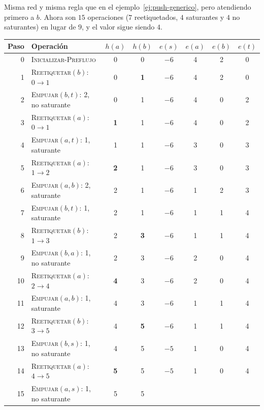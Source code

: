 \documentclass[11pt,letterpaper]{article}
\begin{document}
\begin{ejemplo}
  \label{ej:push-ping-pong}
  Misma red y misma regla que en el ejemplo~\ref{ej:push-generico},
  pero atendiendo primero a $b$. Ahora son $15$ operaciones
  ($7$ reetiquetados, $4$ saturantes y $4$ no saturantes) en lugar de
  $9$, y el valor sigue siendo $4$.
  \begin{center}
  \small
  \begin{tabular}{rlcccccc}
    \toprule
    \textbf{Paso} & \textbf{Operación} & $h(a)$ & $h(b)$
      & $e(s)$ & $e(a)$ & $e(b)$ & $e(t)$ \\
    \midrule
    0 & \textsc{Inicializar-Preflujo} & 0 & 0 & $-6$ & 4 & 2 & 0 \\
    1 & \textsc{Reetiquetar}$(b)$: $0 \to 1$ & 0 & \textbf{1}
      & $-6$ & 4 & 2 & 0 \\
    2 & \textsc{Empujar}$(b, t)$: 2, no saturante & 0 & 1
      & $-6$ & 4 & 0 & 2 \\
    3 & \textsc{Reetiquetar}$(a)$: $0 \to 1$ & \textbf{1} & 1
      & $-6$ & 4 & 0 & 2 \\
    4 & \textsc{Empujar}$(a, t)$: 1, saturante & 1 & 1
      & $-6$ & 3 & 0 & 3 \\
    5 & \textsc{Reetiquetar}$(a)$: $1 \to 2$ & \textbf{2} & 1
      & $-6$ & 3 & 0 & 3 \\
    6 & \textsc{Empujar}$(a, b)$: 2, saturante & 2 & 1
      & $-6$ & 1 & 2 & 3 \\
    7 & \textsc{Empujar}$(b, t)$: 1, saturante & 2 & 1
      & $-6$ & 1 & 1 & 4 \\
    8 & \textsc{Reetiquetar}$(b)$: $1 \to 3$ & 2 & \textbf{3}
      & $-6$ & 1 & 1 & 4 \\
    9 & \textsc{Empujar}$(b, a)$: 1, no saturante & 2 & 3
      & $-6$ & 2 & 0 & 4 \\
    10 & \textsc{Reetiquetar}$(a)$: $2 \to 4$ & \textbf{4} & 3
      & $-6$ & 2 & 0 & 4 \\
    11 & \textsc{Empujar}$(a, b)$: 1, saturante & 4 & 3
      & $-6$ & 1 & 1 & 4 \\
    12 & \textsc{Reetiquetar}$(b)$: $3 \to 5$ & 4 & \textbf{5}
      & $-6$ & 1 & 1 & 4 \\
    13 & \textsc{Empujar}$(b, s)$: 1, no saturante & 4 & 5
      & $-5$ & 1 & 0 & 4 \\
    14 & \textsc{Reetiquetar}$(a)$: $4 \to 5$ & \textbf{5} & 5
      & $-5$ & 1 & 0 & 4 \\
    15 & \textsc{Empujar}$(a, s)$: 1, no saturante & 5 & 5

\end{tabular}
\end{center}
\end{ejemplo}
\end{document}
